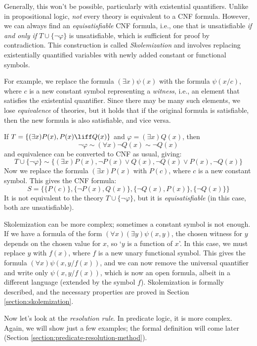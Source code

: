 Generally, this won't be possible, particularly with existential quantifiers. Unlike in propositional logic, \emph{not} every theory is equivalent to a CNF formula. However, we can always find an \emph{equisatisfiable} CNF formula, i.e., one that is unsatisfiable \emph{if and only if} $T\cup\{\neg \varphi\}$ is unsatisfiable, which is sufficient for proof by contradiction. This construction is called \emph{Skolemization} and involves replacing existentially quantified variables with newly added constant or functional symbols.

For example, we replace the formula $(\exists x)\psi(x)$ with the formula $\psi(x/c)$, where $c$ is a new constant symbol representing a \emph{witness}, i.e., an element that satisfies the existential quantifier. Since there may be many such elements, we lose \emph{equivalence} of theories, but it holds that if the original formula is satisfiable, then the new formula is also satisfiable, and vice versa.

\begin{example}
  If $T=\{(\exists x)P(x),P(x)\liff Q(x)\}$ and $\varphi=(\exists x)Q(x)$, then 
  $$
  \neg\varphi\sim(\forall x)\neg Q(x)\sim\neg Q(x)
  $$
  and equivalence can be converted to CNF as usual, giving:
  $$
  T\cup\{\neg \varphi\}\sim\{(\exists x)P(x),\neg P(x)\lor Q(x),\neg Q(x)\lor P(x),\neg Q(x)\}
  $$
  Now we replace the formula $(\exists x)P(x)$ with $P(c)$, where $c$ is a new constant symbol. This gives the CNF formula:
  $$
  S = \{\{P(c)\},\{\neg P(x),Q(x)\},\{\neg Q(x),P(x)\},\{\neg Q(x)\}\}
  $$
  It is not equivalent to the theory $T\cup\{\neg \varphi\}$, but it is \emph{equisatisfiable} (in this case, both are unsatisfiable).
\end{example}

Skolemization can be more complex; sometimes a constant symbol is not enough. If we have a formula of the form $(\forall x)(\exists y)\psi(x,y)$, the chosen witness for $y$ depends on the chosen value for $x$, so `$y$ is a function of $x$'. In this case, we must replace $y$ with $f(x)$, where $f$ is a new unary functional symbol. This gives the formula $(\forall x)\psi(x,y/f(x))$, and we can now remove the universal quantifier and write only $\psi(x,y/f(x))$, which is now an open formula, albeit in a different language (extended by the symbol $f$). Skolemization is formally described, and the necessary properties are proved in Section \ref{section:skolemization}. 

Now let's look at the \emph{resolution rule}. In predicate logic, it is more complex. Again, we will show just a few examples; the formal definition will come later (Section \ref{section:predicate-resolution-method}).

